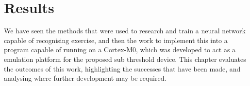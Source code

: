 \chapter{Results}

We have seen the methods that were used to research and train a neural network capable of recognising exercise, and then the work to implement this into a program capable of running on a Cortex-M0, which was developed to act as a emulation platform for the proposed sub threshold device. This chapter evaluates the outcomes of this work, highlighting the successes that have been made, and analysing where further development may be required.




